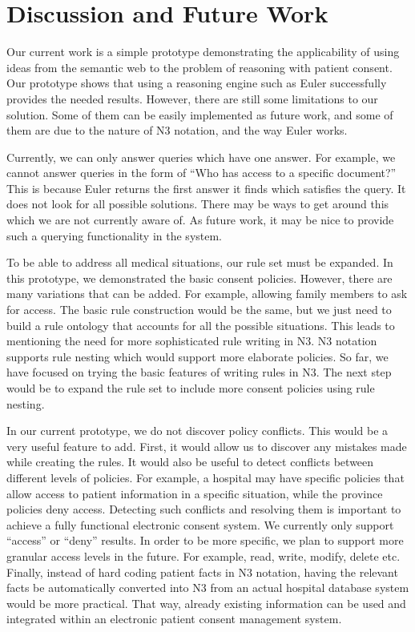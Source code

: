 \documentclass[conference]{IEEEtran}
\begin{document}
\section{Discussion and Future Work}
\label{sec:discFuture}

Our current work is a simple prototype demonstrating the applicability of using ideas from the semantic web to the problem of reasoning with patient consent.
Our prototype shows that using a reasoning engine such as Euler successfully provides the needed results. However, there are still some limitations to our
solution. Some of them can be easily implemented as future work, and some of them are due to the nature of N3 notation, and the way Euler works. 

Currently, we can only answer queries which have one answer. For example, we cannot answer queries in the form of ``Who has access to a specific document?''
This is because
Euler returns the first answer it finds which satisfies the query. It does not look for all possible solutions. There may be ways to get around this which we
are not currently aware of. As future work, it may be nice to provide such a querying functionality in the system.

To be able to address all medical situations, our rule set must be expanded. In this prototype, we demonstrated the basic consent policies. However, there are
many variations that can be added. For example, allowing family members to ask for access. The basic rule construction would be the same, but we just need to
build a rule ontology that accounts for all the possible situations. This leads to mentioning the need for more sophisticated rule writing in N3. N3
notation supports rule nesting which would support more elaborate policies. So far, we have focused on trying the basic features of writing
rules in N3. The next step would be to expand the rule set to include more consent policies using rule nesting.

In our current prototype, we do not discover policy conflicts. This would be a very useful feature to add. First, it would allow us to discover any mistakes
made while creating the rules. It would also be useful to detect conflicts between different levels of policies. For example, a hospital may have specific
policies that allow access to patient information in a specific situation, while the province policies deny access. Detecting such conflicts and resolving them
is important to achieve a fully functional electronic consent system. We currently only support ``access'' or ``deny'' results. In order to be more
specific, we plan to support more granular access levels in the future. For example, read, write, modify, delete etc. Finally, instead of hard coding patient
facts in N3 notation, having the relevant facts be automatically converted into N3 from an actual hospital database system would be more practical.
That way, already existing information can be used and integrated within an electronic patient consent management system.
\end{document}
